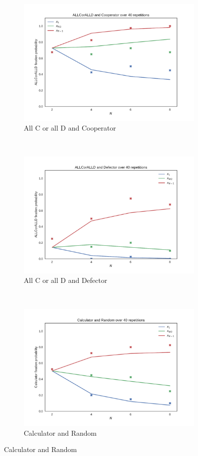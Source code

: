 \documentclass{article}
\begin{document}
\begin{figure}[!hbtp]
    \begin{subfigure}[t]{.3\textwidth}
        \centering
        \includegraphics[width=.8\textwidth]{../img/ALLCorALLD_v_Cooperator.pdf}
        \caption{All C or all D and Cooperator}
    \end{subfigure}%
    ~
    \begin{subfigure}[t]{.3\textwidth}
        \centering
        \includegraphics[width=.8\textwidth]{../img/ALLCorALLD_v_Defector.pdf}
        \caption{All C or all D and Defector}
    \end{subfigure}%
    ~
    \begin{subfigure}[t]{.3\textwidth}
        \centering
        \includegraphics[width=.8\textwidth]{../img/Calculator_v_Random.pdf}
        \caption{Calculator and Random}
    \end{subfigure}%


\end{figure}
\end{document}
